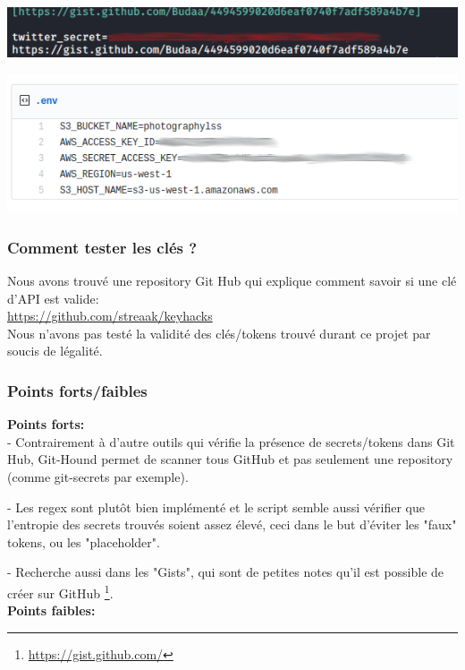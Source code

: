 \includegraphics[scale=0.48]{images/SEN_Projet_Image017.png}

\includegraphics[scale=0.48]{images/SEN_Projet_Image018.png}

\subsubsection{Comment tester les clés ?}

Nous avons trouvé une repository Git Hub qui explique comment savoir si une clé d'API est valide:
\\

\url{https://github.com/streaak/keyhacks} \\

Nous n'avons pas testé la validité des clés/tokens trouvé durant ce projet par soucis de légalité.

\subsubsection{Points forts/faibles}

{\bfseries Points forts:} \\

- Contrairement à d'autre outils qui vérifie la présence de secrets/tokens dans Git Hub, Git-Hound permet de scanner
tous GitHub et pas seulement une repository (comme git-secrets par exemple).

- Les regex sont plutôt bien implémenté et le script semble aussi vérifier que l'entropie des secrets trouvés
soient assez élevé, ceci dans le but d'éviter les "faux" tokens, ou les "placeholder".

- Recherche aussi dans les "Gists", qui sont de petites notes qu'il est possible de créer sur GitHub \footnote{\url{https://gist.github.com/}}.
\\

{\bfseries Points faibles:} \\

